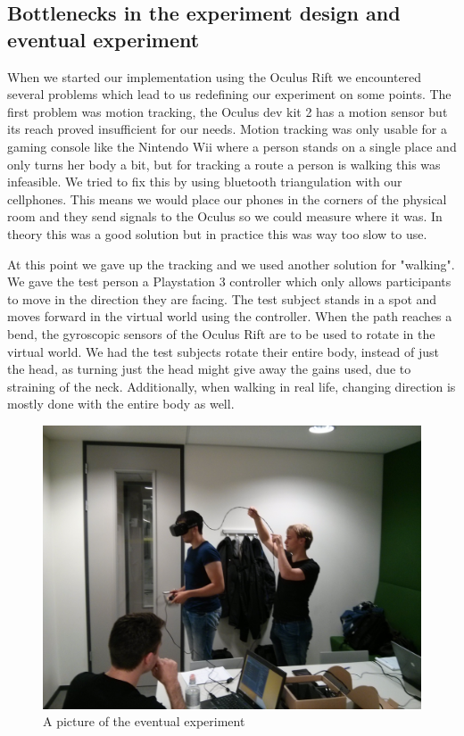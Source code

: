 \subsection{Bottlenecks in the experiment design and eventual experiment}
When we started our implementation using the Oculus Rift we encountered several problems which lead to us redefining our experiment on some points. 
The first problem was motion tracking, the Oculus dev kit 2 has a motion sensor but its reach proved insufficient for our needs.
Motion tracking was only usable for a gaming console like the Nintendo Wii where a person stands on a single place and only turns her body a bit, but for tracking a route a person is walking this was infeasible. 
We tried to fix this by using bluetooth triangulation with our cellphones. 
This means we would place our phones in the corners of the physical room and they send signals to the Oculus so we could measure where it was. 
In theory this was a good solution but in practice this was way too slow to use. 

At this point we gave up the tracking and we used another solution for "walking". 
We gave the test person a Playstation 3 controller which only allows participants to move in the direction they are facing.
The test subject stands in a spot and moves forward in the virtual world using the controller.
When the path reaches a bend, the gyroscopic sensors of the Oculus Rift are to be used to rotate in the virtual world.
We had the test subjects rotate their entire body, instead of just the head, as turning just the head might give away the gains used, due to straining of the neck.
Additionally, when walking in real life, changing direction is mostly done with the entire body as well.

\begin{figure}[htb]
	\centering
	\includegraphics[width=\linewidth]{sections/finalreport/images/experiment.jpg}	
	\caption{A picture of the eventual experiment}
\end{figure}

